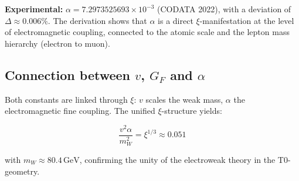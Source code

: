 	\textbf{Experimental:} $\alpha = 7.2973525693 \times 10^{-3}$ (CODATA 2022), with a deviation of $\Delta \approx 0.006\%$. The derivation shows that $\alpha$ is a direct $\xi$-manifestation at the level of electromagnetic coupling, connected to the atomic scale and the lepton mass hierarchy (electron to muon).
	
	\subsection{Connection between $v$, $G_F$ and $\alpha$}
	Both constants are linked through $\xi$: $v$ scales the weak mass, $\alpha$ the electromagnetic fine coupling. The unified $\xi$-structure yields:
	
	\begin{equation}
		\frac{v^2 \alpha}{m_W^2} = \xi^{1/3} \approx 0.051
	\end{equation}
	
	with $m_W \approx 80.4\,\si{\giga\electronvolt}$, confirming the unity of the electroweak theory in the T0-geometry.


